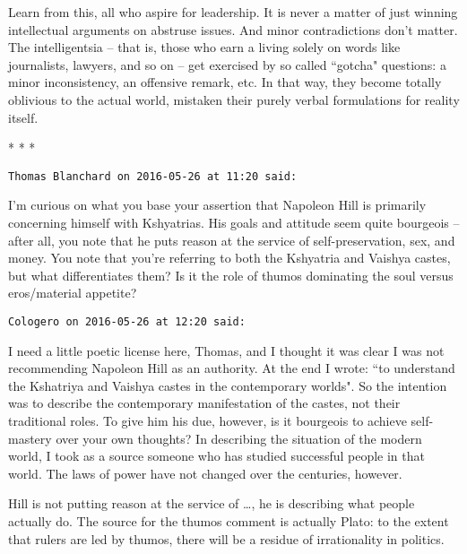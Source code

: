 Learn from this, all who aspire for leadership. It is never a matter of just winning intellectual arguments on abstruse issues. And minor contradictions don't matter. The intelligentsia – that is, those who earn a living solely on words like journalists, lawyers, and so on – get exercised by so called ``gotcha" questions: a minor inconsistency, an offensive remark, etc. In that way, they become totally oblivious to the actual world, mistaken their purely verbal formulations for reality itself.


\begin{center}* * *\end{center}

\begin{footnotesize}\begin{sffamily}



\texttt{Thomas Blanchard on 2016-05-26 at 11:20 said: }

I'm curious on what you base your assertion that Napoleon Hill is primarily concerning himself with Kshyatrias. His goals and attitude seem quite bourgeois – after all, you note that he puts reason at the service of self-preservation, sex, and money. You note that you're referring to both the Kshyatria and Vaishya castes, but what differentiates them? Is it the role of thumos dominating the soul versus eros/material appetite?


\hfill

\texttt{Cologero on 2016-05-26 at 12:20 said: }

I need a little poetic license here, Thomas, and I thought it was clear I was not recommending Napoleon Hill as an authority. At the end I wrote: ``to understand the Kshatriya and Vaishya castes in the contemporary worlds". So the intention was to describe the contemporary manifestation of the castes, not their traditional roles. To give him his due, however, is it bourgeois to achieve self-mastery over your own thoughts? In describing the situation of the modern world, I took as a source someone who has studied successful people in that world. The laws of power have not changed over the centuries, however.

Hill is not putting reason at the service of …, he is describing what people actually do. The source for the thumos comment is actually Plato: to the extent that rulers are led by thumos, there will be a residue of irrationality in politics.


\end{sffamily}
\end{footnotesize}
